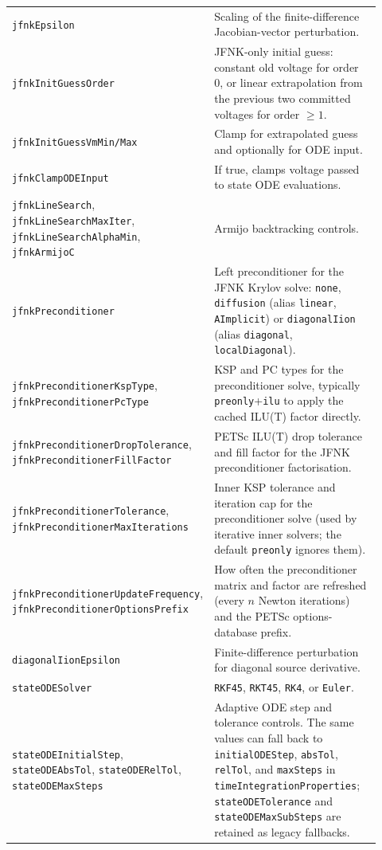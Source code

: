 \documentclass[11pt,a4paper]{article}
\newcommand{\code}[1]{\texttt{\small #1}}
\begin{document}
\begin{longtable}{@{}p{0.34\linewidth}p{0.58\linewidth}@{}}
\code{jfnkEpsilon} & Scaling of the finite-difference Jacobian-vector perturbation. \\
\code{jfnkInitGuessOrder} & JFNK-only initial guess: constant old voltage for order 0, or linear extrapolation from the previous two committed voltages for order $\ge 1$. \\
\code{jfnkInitGuessVmMin/Max} & Clamp for extrapolated guess and optionally for ODE input. \\
\code{jfnkClampODEInput} & If true, clamps voltage passed to state ODE evaluations. \\
\code{jfnkLineSearch}, \code{jfnkLineSearchMaxIter}, \code{jfnkLineSearchAlphaMin}, \code{jfnkArmijoC} & Armijo backtracking controls. \\
\code{jfnkPreconditioner} & Left preconditioner for the JFNK Krylov solve: \code{none}, \code{diffusion} (alias \code{linear}, \code{AImplicit}) or \code{diagonalIion} (alias \code{diagonal}, \code{localDiagonal}). \\
\code{jfnkPreconditionerKspType}, \code{jfnkPreconditionerPcType} & KSP and PC types for the preconditioner solve, typically \code{preonly}+\code{ilu} to apply the cached ILU(T) factor directly. \\
\code{jfnkPreconditionerDropTolerance}, \code{jfnkPreconditionerFillFactor} & PETSc ILU(T) drop tolerance and fill factor for the JFNK preconditioner factorisation. \\
\code{jfnkPreconditionerTolerance}, \code{jfnkPreconditionerMaxIterations} & Inner KSP tolerance and iteration cap for the preconditioner solve (used by iterative inner solvers; the default \code{preonly} ignores them). \\
\code{jfnkPreconditionerUpdateFrequency}, \code{jfnkPreconditionerOptionsPrefix} & How often the preconditioner matrix and factor are refreshed (every $n$ Newton iterations) and the PETSc options-database prefix. \\
\code{diagonalIionEpsilon} & Finite-difference perturbation for diagonal source derivative. \\
\code{stateODESolver} & \code{RKF45}, \code{RKT45}, \code{RK4}, or \code{Euler}. \\
\code{stateODEInitialStep}, \code{stateODEAbsTol}, \code{stateODERelTol}, \code{stateODEMaxSteps} & Adaptive ODE step and tolerance controls. The same values can fall back to \code{initialODEStep}, \code{absTol}, \code{relTol}, and \code{maxSteps} in \code{timeIntegrationProperties}; \code{stateODETolerance} and \code{stateODEMaxSubSteps} are retained as legacy fallbacks. \\

\end{longtable}
\end{document}
